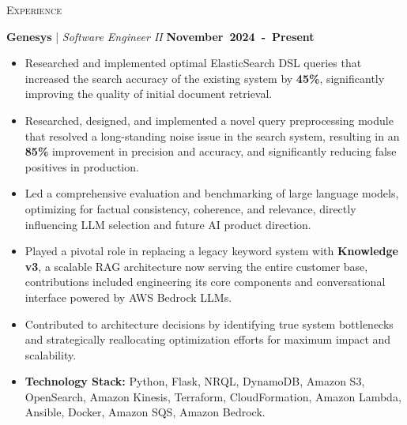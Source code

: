 \documentclass[11pt, a4paper]{article}
\newcommand{\dates}[1]{\hfill\mbox{\textbf{#1}}} %
\newcommand{\headright}[1]{\vspace*{1.5ex}\textsc{\Large\color{heading}#1}\par%
     \vspace*{-1.5ex}{\color{accent}\hrulefill}\par}
\begin{document}
\begin{minipage}[t]{0.66\textwidth}
\setlength{\parskip}{0.5ex}%

\vspace{2ex}

\headright{Experience}

\large\textbf{{Genesys}} \normalsize | \textit{Software Engineer II}  \dates{November 2024 - Present}
\begin{itemize}
\item Researched and implemented optimal ElasticSearch DSL queries that increased the search accuracy of the existing system by \textbf{45\%}, significantly improving the quality of initial document retrieval.
\item Researched, designed, and implemented a novel query preprocessing module that resolved a long-standing noise issue in the search system, resulting in an \textbf{85\%} improvement in precision and accuracy, and significantly reducing false positives in production.
\item Led a comprehensive evaluation and benchmarking of large language models, optimizing for factual consistency, coherence, and relevance, directly influencing LLM selection and future AI product direction.
\item Played a pivotal role in replacing a legacy keyword system with \textbf{Knowledge v3}, a scalable RAG architecture now serving the entire customer base, contributions included engineering its core components and conversational interface powered by AWS Bedrock LLMs.
\item Contributed to architecture decisions by identifying true system bottlenecks and strategically reallocating optimization efforts for maximum impact and scalability.
\item \textbf{Technology Stack:} Python, Flask, NRQL, DynamoDB, Amazon S3, OpenSearch, Amazon Kinesis, Terraform, CloudFormation, Amazon Lambda, Ansible, Docker, Amazon SQS, Amazon Bedrock.
\end{itemize}


\end{minipage}
\end{document}
